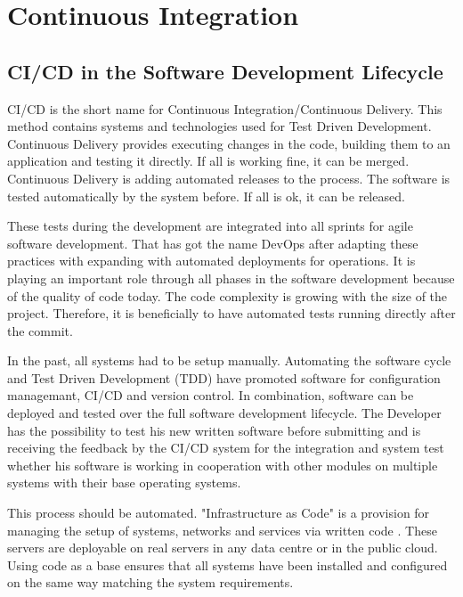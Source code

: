 \chapter{Continuous Integration}\label{ch:ci_cd}

\section{CI/CD in the Software Development Lifecycle}

CI/CD is the short name for Continuous Integration/Continuous Delivery. This method contains systems and technologies used for Test Driven Development. Continuous Delivery provides executing changes in the code, building them to an application and testing it directly. 
If all is working fine, it can be merged. Continuous Delivery is adding automated releases to the process. 
The software is tested automatically by the system before. If all is ok, it can be released.

These tests during the development are integrated into all sprints for agile software development. That has got the name DevOps after adapting these practices with expanding with automated deployments for operations. It is playing an important role through all phases in the software development because of the quality of code today. The code complexity is growing with the size of the project. Therefore, it is beneficially to have automated tests running directly after the commit. 

In the past, all systems had to be setup manually. Automating the software cycle and Test Driven Development (TDD) have promoted software for configuration managemant, CI/CD and version control. In combination, software can be deployed and tested over the full software development lifecycle. The Developer has the possibility to test his new written software before submitting and is receiving the feedback by the CI/CD system for the integration and system test whether his software is working in cooperation with other modules on multiple systems with their base operating systems.

This process should be automated. "Infrastructure as Code" is a provision for managing the setup of systems, networks and services via written code \cite[~p.110]{Scholl2019}. These servers are deployable on real servers in any data centre or in the public cloud. Using code as a base ensures that all systems have been installed and configured on the same way matching the system requirements. 

